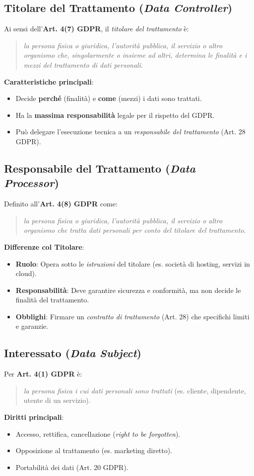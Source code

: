 \documentclass[8pt,oneside,a4paper]{article}
\begin{document}
	\subsection{Titolare del Trattamento (\textit{Data Controller})}
	Ai sensi dell'\textbf{Art. 4(7) GDPR}, il \textit{titolare del trattamento} è:
	\begin{quote}
		\textit{la persona fisica o giuridica, l'autorità pubblica, il servizio o altro organismo che, singolarmente o insieme ad altri, determina le finalità e i mezzi del trattamento di dati personali}.
	\end{quote}
	\noindent \textbf{Caratteristiche principali}:
	\begin{itemize}
		\item Decide \textbf{perché} (finalità) e \textbf{come} (mezzi) i dati sono trattati.
		\item Ha la \textbf{massima responsabilità} legale per il rispetto del GDPR.
		\item Può delegare l'esecuzione tecnica a un \textit{responsabile del trattamento} (Art. 28 GDPR).
	\end{itemize}
	\subsection{Responsabile del Trattamento (\textit{Data Processor})}
	Definito all'\textbf{Art. 4(8) GDPR} come:
	\begin{quote}
		\textit{la persona fisica o giuridica, l'autorità pubblica, il servizio o altro organismo che tratta dati personali per conto del titolare del trattamento}.
	\end{quote}
	\noindent \textbf{Differenze col Titolare}:
	\begin{itemize}
		\item \textbf{Ruolo}: Opera sotto le \textit{istruzioni} del titolare (es. società di hosting, servizi in cloud).
		\item \textbf{Responsabilità}: Deve garantire sicurezza e conformità, ma non decide le finalità del trattamento.
		\item \textbf{Obblighi}: Firmare un \textit{contratto di trattamento} (Art. 28) che specifichi limiti e garanzie.
	\end{itemize}
	\subsection{Interessato (\textit{Data Subject})}
	Per \textbf{Art. 4(1) GDPR} è:
	\begin{quote}
		\textit{la persona fisica i cui dati personali sono trattati} (es. cliente, dipendente, utente di un servizio).
	\end{quote}
	\noindent \textbf{Diritti principali}:
	\begin{itemize}
		\item Accesso, rettifica, cancellazione (\textit{right to be forgotten}).
		\item Opposizione al trattamento (es. marketing diretto).
		\item Portabilità dei dati (Art. 20 GDPR).
	\end{itemize}
\end{document}

